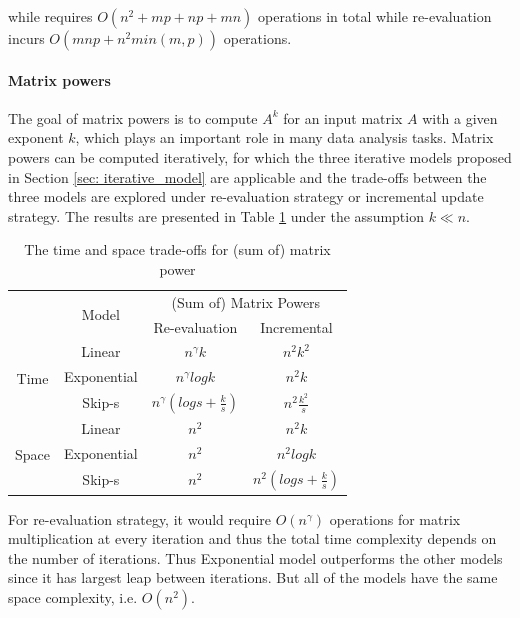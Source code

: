 while requires $O(n^2 + mp + np + mn)$ operations in total while re-evaluation incurs $O(mnp + n^2min(m,p))$ operations.

\paragraph{Matrix powers}
The goal of matrix powers is to compute $A^k$ for an input matrix $A$ with a given exponent $k$, which plays an important role in many data analysis tasks. Matrix powers can be computed iteratively, for which the three iterative models proposed in Section \ref{sec: iterative_model} are applicable and the trade-offs between the three models are explored under re-evaluation strategy or incremental update strategy. The results are presented in Table \ref{tab:time_space_complexity_matrix_power} under the assumption $k \ll n$.

\begin{table}[h]
    \centering
    \begin{tabular}{|c|c|c|c|}\hline
        &\multirow{2}{*}{Model} & \multicolumn{2}{|c|}{(Sum of) Matrix Powers}  \\\hhline{~~--}
        &&Re-evaluation & Incremental\\ \hline
    \multirow{3}{*}{Time}&Linear & $n^{\gamma}k$ & $n^2k^2$\\\hhline{~---}
    &Exponential & $n^{\gamma}log k$ & $n^2k$\\\hhline{~---}
    &Skip-s & $n^{\gamma}(logs+\frac{k}{s})$ & $n^2\frac{k^2}{s}$\\\hline
    \multirow{3}{*}{Space}&Linear & $n^2$ & $n^2k$\\\hhline{~---}
    &Exponential & $n^2$ & $n^2log k$\\\hhline{~---}
    &Skip-s & $n^2$ & $n^2(logs+\frac{k}{s})$\\\hline
    \end{tabular}
    \caption{The time and space trade-offs for (sum of) matrix power}
    \label{tab:time_space_complexity_matrix_power}
\end{table}

For re-evaluation strategy, it would require $O(n^{\gamma})$ operations for matrix multiplication at every iteration and thus the total time complexity depends on the number of iterations. Thus Exponential model outperforms the other models since it has largest leap between iterations. But all of the models have the same space complexity, i.e. $O(n^2)$.

